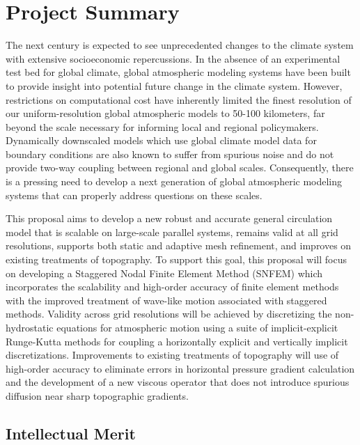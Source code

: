 \documentclass[11pt]{article}
\begin{document}
\appendix

\addtocounter{section}{1}

\section{Project Summary}
\vspace{-0.2cm}

The next century is expected to see unprecedented changes to the climate system with extensive socioeconomic repercussions.  In the absence of an experimental test bed for global climate, global atmospheric modeling systems have been built to provide insight into potential future change in the climate system.  However, restrictions on computational cost have inherently limited the finest resolution of our uniform-resolution global atmospheric models to 50-100 kilometers, far beyond the scale necessary for informing local and regional policymakers.  Dynamically downscaled models which use global climate model data for boundary conditions are also known to suffer from spurious noise and do not provide two-way coupling between regional and global scales.  Consequently, there is a pressing need to develop a next generation of global atmospheric modeling systems that can properly address questions on these scales.

This proposal aims to develop a new robust and accurate general circulation model that is scalable on large-scale parallel systems, remains valid at all grid resolutions, supports both static and adaptive mesh refinement, and improves on existing treatments of topography.  To support this goal, this proposal will focus on developing a Staggered Nodal Finite Element Method (SNFEM) which incorporates the scalability and high-order accuracy of finite element methods with the improved treatment of wave-like motion associated with staggered methods.  Validity across grid resolutions will be achieved by discretizing the non-hydrostatic equations for atmospheric motion using a suite of implicit-explicit Runge-Kutta methods for coupling a horizontally explicit and vertically implicit discretizations.  Improvements to existing treatments of topography will use of high-order accuracy to eliminate errors in horizontal pressure gradient calculation and the development of a new viscous operator that does not introduce spurious diffusion near sharp topographic gradients.

\vspace{-0.5cm}
\subsection*{Intellectual Merit}
\vspace{-0.5cm}
\end{document}
